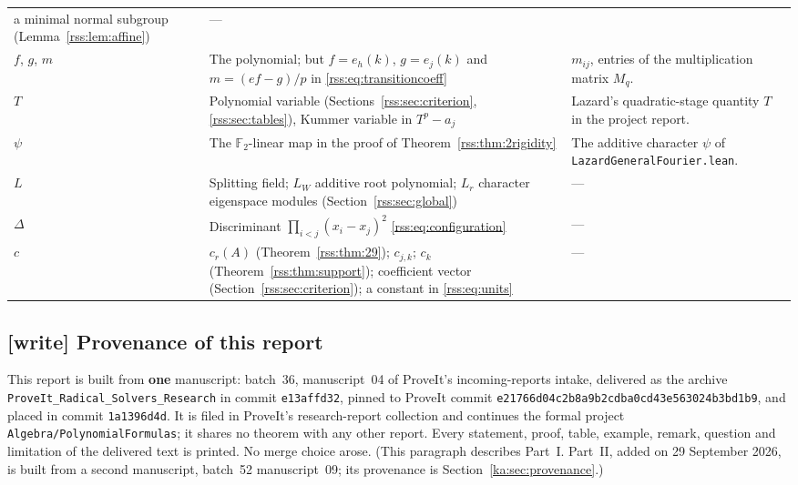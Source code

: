\documentclass[11pt,a4paper]{article}
\theoremstyle{definition}
\theoremstyle{remark}
\newcommand{\F}{\mathbb F}
\newcommand{\code}[1]{{\small\nolinkurl{#1}}}
\begin{document}
\begin{center}
\begin{tabularx}{\textwidth}{@{}L{0.14\textwidth}>{\raggedright\arraybackslash}X>{\raggedright\arraybackslash}X@{}}
a minimal normal subgroup (Lemma~\ref{rss:lem:affine}) & ---\\
$f$, $g$, $m$ &
The polynomial; but $f=e_h(k)$, $g=e_j(k)$ and $m=(ef-g)/p$ in
\eqref{rss:eq:transitioncoeff} &
$m_{ij}$, entries of the multiplication matrix $M_q$.\\
$T$ &
Polynomial variable (Sections~\ref{rss:sec:criterion}, \ref{rss:sec:tables}),
Kummer variable in $T^p-a_j$ &
Lazard's quadratic-stage quantity $T$ in the project report.\\
$\psi$ &
The $\F_2$-linear map in the proof of Theorem~\ref{rss:thm:2rigidity} &
The additive character $\psi$ of \code{LazardGeneralFourier.lean}.\\
$L$ &
Splitting field; $L_W$ additive root polynomial; $L_r$ character
eigenspace modules (Section~\ref{rss:sec:global}) & ---\\
$\Delta$ &
Discriminant $\prod_{i<j}(x_i-x_j)^2$ \eqref{rss:eq:configuration} & ---\\
$c$ &
$c_r(A)$ (Theorem~\ref{rss:thm:29}); $c_{j,k}$; $c_k$ (Theorem~\ref{rss:thm:support});
coefficient vector (Section~\ref{rss:sec:criterion}); a constant in \eqref{rss:eq:units} & ---\\
\bottomrule
\end{tabularx}
\end{center}

\subsection{[write] Provenance of this report}
\label{rss:sec:provenance}

This report is built from \textbf{one} manuscript: batch~36, manuscript~04 of
ProveIt's incoming-reports intake, delivered as the archive
\code{ProveIt_Radical_Solvers_Research} in commit \code{e13affd32}, pinned to
ProveIt commit \code{e21766d04c2b8a9b2cdba0cd43e563024b3bd1b9}, and placed in
commit \code{1a1396d4d}. It is filed in ProveIt's research-report collection
and continues the formal project \code{Algebra/PolynomialFormulas}; it shares
no theorem with any other report. Every statement, proof, table, example,
remark, question and limitation of the delivered text is printed. No merge
choice arose. (This paragraph describes Part~I. Part~II, added on
29 September 2026, is built from a second manuscript, batch~52
manuscript~09; its provenance is Section~\ref{ka:sec:provenance}.)
\end{document}
